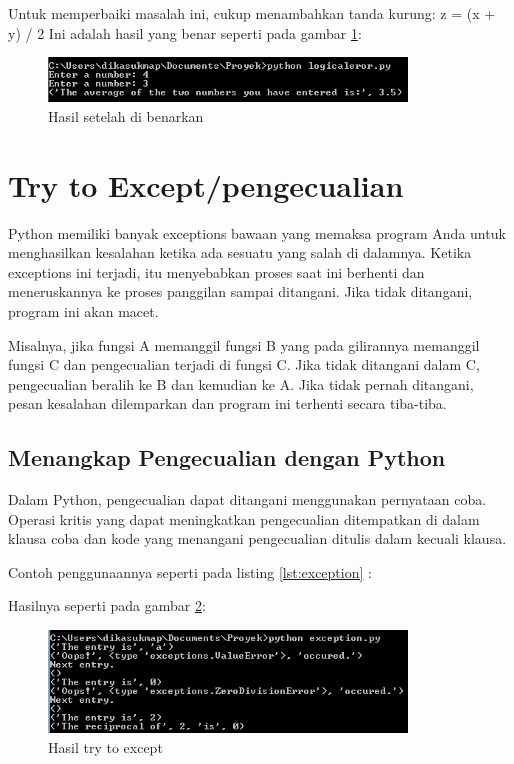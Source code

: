 Untuk memperbaiki masalah ini, cukup menambahkan tanda kurung: z = (x + y) / 2
Ini adalah hasil yang benar seperti pada gambar \ref{fig:benarlogika}:
\begin{figure}[!htbp]
	\centerline{\includegraphics[width=0.85\textwidth]{figures/2/benarlogika.PNG}}
	\caption{Hasil setelah di benarkan}
	\label{fig:benarlogika}
\end{figure}

\section{Try to Except/pengecualian}
Python memiliki banyak exceptions bawaan yang memaksa program Anda untuk menghasilkan kesalahan ketika ada sesuatu yang salah di dalamnya. Ketika exceptions ini terjadi, itu menyebabkan proses saat ini berhenti dan meneruskannya ke proses panggilan sampai ditangani. Jika tidak ditangani, program ini akan macet.

Misalnya, jika fungsi A memanggil fungsi B yang pada gilirannya memanggil fungsi C dan pengecualian terjadi di fungsi C. Jika tidak ditangani dalam C, pengecualian beralih ke B dan kemudian ke A. Jika tidak pernah ditangani, pesan kesalahan dilemparkan dan program ini terhenti secara tiba-tiba.

\subsection{Menangkap Pengecualian dengan Python}
Dalam Python, pengecualian dapat ditangani menggunakan pernyataan coba. Operasi kritis yang dapat meningkatkan pengecualian ditempatkan di dalam klausa coba dan kode yang menangani pengecualian ditulis dalam kecuali klausa.

Contoh penggunaannya seperti pada listing \ref{lst:exception} :


Hasilnya seperti pada gambar \ref{fig:exception}:
\begin{figure}[!htbp]
	\centerline{\includegraphics[width=0.85\textwidth]{figures/2/exception.PNG}}
	\caption{Hasil try to except}
	\label{fig:exception}
\end{figure}

